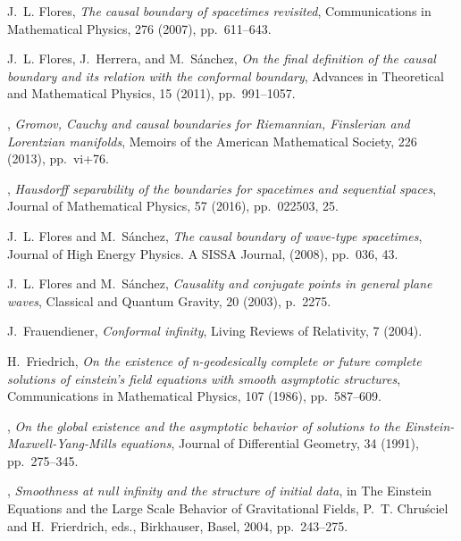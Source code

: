 \documentclass[11pt]{article}
\begin{document}
\begin{thebibliography}{10}
{\sc J.~L. Flores}, {\em The causal boundary of spacetimes revisited},
  Communications in Mathematical Physics, 276 (2007), pp.~611--643.

{\sc J.~L. Flores, J.~Herrera, and M.~S{\'a}nchez}, {\em On the final
  definition of the causal boundary and its relation with the conformal
  boundary}, Advances in Theoretical and Mathematical Physics, 15 (2011),
  pp.~991--1057.

\leavevmode\vrule height 2pt depth -1.6pt width 23pt, {\em Gromov, {{Cauchy}}
  and causal boundaries for {{Riemannian}}, {{Finslerian}} and {{Lorentzian}}
  manifolds}, Memoirs of the American Mathematical Society, 226 (2013),
  pp.~vi+76.

\leavevmode\vrule height 2pt depth -1.6pt width 23pt, {\em Hausdorff
  separability of the boundaries for spacetimes and sequential spaces}, Journal
  of Mathematical Physics, 57 (2016), pp.~022503, 25.

{\sc J.~L. Flores and M.~S{\'a}nchez}, {\em The causal boundary of wave-type
  spacetimes}, Journal of High Energy Physics. A SISSA Journal,  (2008),
  pp.~036, 43.

{\sc J.~L. Flores and M.~Sánchez}, {\em Causality and conjugate points in
  general plane waves}, Classical and Quantum Gravity, 20 (2003), p.~2275.

{\sc J.~Frauendiener}, {\em Conformal infinity}, Living Reviews of Relativity,
  7 (2004).

{\sc H.~Friedrich}, {\em On the existence of n-geodesically complete or future
  complete solutions of einstein’s field equations with smooth asymptotic
  structures}, Communications in Mathematical Physics, 107 (1986),
  pp.~587--609.

\leavevmode\vrule height 2pt depth -1.6pt width 23pt, {\em On the global
  existence and the asymptotic behavior of solutions to the
  {{Einstein}}-{{Maxwell}}-{{Yang}}-{{Mills}} equations}, Journal of
  Differential Geometry, 34 (1991), pp.~275--345.

\leavevmode\vrule height 2pt depth -1.6pt width 23pt, {\em Smoothness at null
  infinity and the structure of initial data}, in The Einstein Equations and
  the Large Scale Behavior of Gravitational Fields, P.~T. Chru{\'s}ciel and
  H.~Frierdrich, eds., {Birkhauser}, Basel, 2004, pp.~243--275.


\end{thebibliography}
\end{document}
